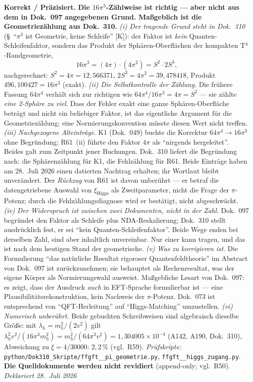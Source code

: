 \smallskip\noindent\textbf{Korrekt / Präzisiert.}\quad
\textbf{Die $16\pi^3$-Zählweise ist richtig --- aber nicht aus dem in
Dok.~097 angegebenen Grund. Maßgeblich ist die Geometriezählung aus
Dok.~310.}
\emph{(i) Der tragende Grund steht in Dok.~310} (\S~\enquote{$\pi^3$ ist
Geometrie, keine Schleife} [K]): der Faktor ist \emph{kein}
Quanten-Schleifenfaktor, sondern das Produkt der Sphären-Oberflächen der
kompakten T$^4$-Randgeometrie,
\[
  16\pi^3 = (4\pi)\cdot(4\pi^2) = S^2 \cdot 2S^3 ,
\]
nachgerechnet: $S^2 = 4\pi = 12{,}566371$, $2S^3 = 4\pi^2 = 39{,}478418$,
Produkt $496{,}100427 = 16\pi^3$ (exakt).
\emph{(ii) Die Selbstkontrolle der Zählung.} Die frühere Fassung $64\pi^4$
verhält sich zur richtigen wie $64\pi^4/16\pi^3 = 4\pi = S^2$ --- sie
zählte \emph{eine 2-Sphäre zu viel}. Dass der Fehler exakt eine ganze
Sphären-Oberfläche beträgt und nicht ein beliebiger Faktor, ist das
eigentliche Argument für die Geometriezählung; eine
Normierungskonvention müsste diesen Wert nicht treffen.
\emph{(iii) Nachgezogene Alteinträge.} K1 (Dok.~049) buchte die Korrektur $64\pi^4 \to 16\pi^3$ ohne Begründung; R61~(ii) führte den Faktor $4\pi$ als \enquote{nirgends hergeleitet}. Beides galt zum Zeitpunkt jener Buchungen. Dok.~310 liefert die Begründung nach: die Sphärenzählung für K1, die Fehlzählung für R61. Beide Einträge haben am 28.~Juli 2026 einen datierten Nachtrag erhalten; ihr Wortlaut bleibt unverändert. Der \emph{Rückzug} von R61 ist davon unberührt --- er betraf die datengetriebene Auswahl von $\xi_\text{Higgs}$ als Zweitparameter, nicht die Frage der $\pi$-Potenz; durch die Fehlzählungsdiagnose wird er bestätigt, nicht abgeschwächt. \emph{(iv) Der Widerspruch ist zwischen zwei Dokumenten, nicht in der
Zahl.} Dok.~097 begründet den Faktor als Schleife plus NDA-Reskalierung;
Dok.~310 stellt ausdrücklich fest, er sei \enquote{kein
Quanten-Schleifenfaktor}. Beide Wege enden bei derselben Zahl, sind aber
inhaltlich unvereinbar. Nur einer kann tragen, und das ist nach dem
heutigen Stand der geometrische.
\emph{(v) Was zu korrigieren ist.} Die Formulierung
\enquote{das natürliche Resultat rigoroser Quantenfeldtheorie} im
Abstract von Dok.~097 ist zurückzunehmen; sie behauptet als
Rechenresultat, was der eigene Körper als Normierungswahl ausweist.
Maßgebliche Lesart von Dok.~097: es zeigt, dass der Ausdruck \emph{auch}
in EFT-Sprache formulierbar ist --- eine Plausibilitätsrekonstruktion,
kein Nachweis der $\pi$-Potenz. Dok.~073 ist entsprechend von
\enquote{QFT-Herleitung} auf \enquote{Higgs-Matching} umzustellen.
\emph{(vi) Numerisch unberührt.} Beide gebuchten Schreibweisen sind
algebraisch dieselbe Größe: mit $\lambda_h = m_h^2/(2v^2)$ gilt
$\lambda_h^2 v^2/(16\pi^3 m_h^2) = m_h^2/(64\pi^3 v^2)
= 1{,}304005\times10^{-4}$ (A142, A190, Dok.~310), Abweichung zu
$\xi = 4/30000$: $2{,}2\,\%$ (vgl.\ R59).
\emph{Prüfskripte:}
\texttt{python/\allowbreak Dok310\_\allowbreak Skripte/\allowbreak ffgft\_\_\allowbreak pi\_\allowbreak geometrie.py},
\texttt{ffgft\_\_\allowbreak higgs\_\allowbreak zugang.py}.
\textbf{Die Quelldokumente werden nicht revidiert}
(append-only; vgl.\ R50). \emph{Deklariert 28.~Juli 2026}

